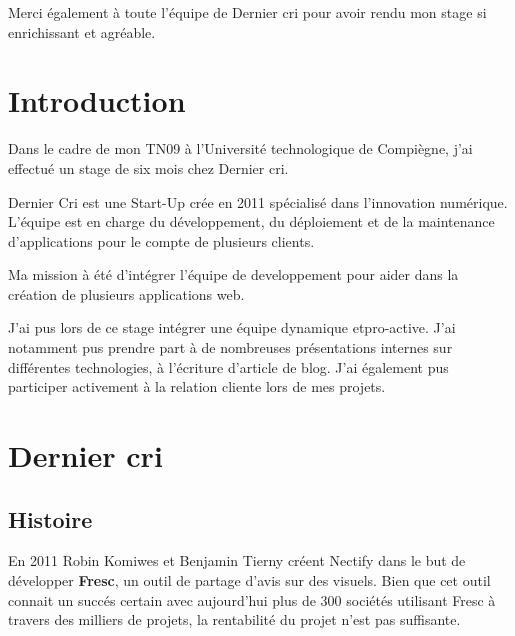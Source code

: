 \documentclass[12pt,a4paper]{article}
\begin{document}
  \bigskip

  Merci également à toute l'équipe de Dernier cri pour avoir rendu mon
  stage si enrichissant et agréable.

  \newpage

  \section{Introduction}\label{introduction}

  \bigskip

  Dans le cadre de mon TN09 à l'Université technologique de Compiègne,
  j'ai effectué un stage de six mois chez Dernier cri.

  \bigskip

  Dernier Cri est une Start-Up crée en 2011 spécialisé dans l'innovation
  numérique. L'équipe est en charge du développement, du déploiement et de
  la maintenance d'applications pour le compte de plusieurs clients.

  \bigskip

  Ma mission à été d'intégrer l'équipe de developpement pour aider dans la
  création de plusieurs applications web.

  \bigskip

  J'ai pus lors de ce stage intégrer une équipe dynamique etpro-active.
  J'ai notamment pus prendre part à de nombreuses présentations internes
  sur différentes technologies, à l'écriture d'article de blog. J'ai
  également pus participer activement à la relation cliente lors de mes
  projets.

  \newpage

  \section{Dernier cri}\label{dernier-cri}

  \bigskip

  \subsection{Histoire}\label{histoire}

  \bigskip

  En 2011 Robin Komiwes et Benjamin Tierny créent Nectify dans le but de
  développer \textbf{Fresc}, un outil de partage d'avis sur des visuels.
  Bien que cet outil connait un succés certain avec aujourd'hui plus de
  300 sociétés utilisant Fresc à travers des milliers de projets, la
  rentabilité du projet n'est pas suffisante.
\end{document}
